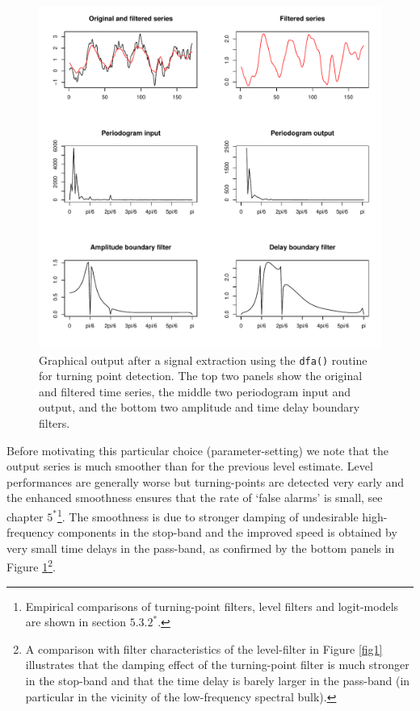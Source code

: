 \documentclass[a4paper]{article}
\begin{document}
\begin{figure}[h!] 
\begin{center}
\includegraphics[width=\textwidth]{tpfilter_la5_exp1k5_pbd1k02_pb_6k5_sb6_limamp5_nloops10_d0}
\caption{Graphical output after a signal extraction using the
  \texttt{dfa()} routine for turning point detection. The top two
  panels show the original and filtered time series, the middle two
  periodogram input and output, and the bottom two amplitude and time
  delay boundary filters.\label{fig2}}
\end{center}
\end{figure}

Before motivating this particular choice (parameter-setting) we note
that the output series is much smoother than for the previous level
estimate. Level performances are generally worse but turning-points
are detected very early and the enhanced smoothness ensures that the
rate of `false alarms' is small, see chapter $5^*$\footnote{Empirical
  comparisons of turning-point filters, level filters and logit-models
  are shown in section $5.3.2^*$.}. The smoothness is due to stronger
damping of undesirable high-frequency components in the stop-band and
the improved speed is obtained by very small time delays in the
pass-band, as confirmed by the bottom panels in
Figure \ref{fig2}\footnote{A comparison with filter characteristics of
  the level-filter in Figure \ref{fig1} illustrates that the damping
  effect of the turning-point filter is much stronger in the stop-band
  and that the time delay is barely larger in the pass-band (in
  particular in the vicinity of the low-frequency spectral bulk).}.\\
\end{document}
